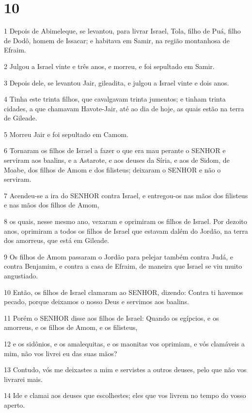 \chapter{10}

\par 1 Depois de Abimeleque, se levantou, para livrar Israel, Tola, filho de Puá, filho de Dodô, homem de Issacar; e habitava em Samir, na região montanhosa de Efraim.
\par 2 Julgou a Israel vinte e três anos, e morreu, e foi sepultado em Samir.
\par 3 Depois dele, se levantou Jair, gileadita, e julgou a Israel vinte e dois anos.
\par 4 Tinha este trinta filhos, que cavalgavam trinta jumentos; e tinham trinta cidades, a que chamavam Havote-Jair, até ao dia de hoje, as quais estão na terra de Gileade.
\par 5 Morreu Jair e foi sepultado em Camom.
\par 6 Tornaram os filhos de Israel a fazer o que era mau perante o SENHOR e serviram aos baalins, e a Astarote, e aos deuses da Síria, e aos de Sidom, de Moabe, dos filhos de Amom e dos filisteus; deixaram o SENHOR e não o serviram.
\par 7 Acendeu-se a ira do SENHOR contra Israel, e entregou-os nas mãos dos filisteus e nas mãos dos filhos de Amom,
\par 8 os quais, nesse mesmo ano, vexaram e oprimiram os filhos de Israel. Por dezoito anos, oprimiram a todos os filhos de Israel que estavam dalém do Jordão, na terra dos amorreus, que está em Gileade.
\par 9 Os filhos de Amom passaram o Jordão para pelejar também contra Judá, e contra Benjamim, e contra a casa de Efraim, de maneira que Israel se viu muito angustiado.
\par 10 Então, os filhos de Israel clamaram ao SENHOR, dizendo: Contra ti havemos pecado, porque deixamos o nosso Deus e servimos aos baalins.
\par 11 Porém o SENHOR disse aos filhos de Israel: Quando os egípcios, e os amorreus, e os filhos de Amom, e os filisteus,
\par 12 e os sidônios, e os amalequitas, e os maonitas vos oprimiam, e vós clamáveis a mim, não vos livrei eu das suas mãos?
\par 13 Contudo, vós me deixastes a mim e servistes a outros deuses, pelo que não vos livrarei mais.
\par 14 Ide e clamai aos deuses que escolhestes; eles que vos livrem no tempo do vosso aperto.
